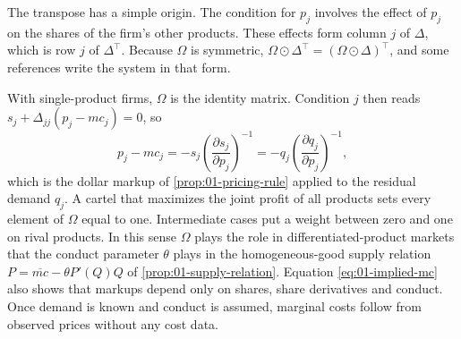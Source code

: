 The transpose has a simple origin. The condition for $p_j$ involves the effect of $p_j$ on the shares of the
firm's other products. These effects form column $j$ of $\Delta$, which is row $j$ of $\Delta^\top$.
Because $\Omega$ is symmetric, $\Omega \odot \Delta^\top = (\Omega \odot \Delta)^\top$, and some references
write the system in that form.

\begin{remark}\label{rem:01-foc-cases}
With single-product firms, $\Omega$ is the identity matrix. Condition $j$ then reads
$s_j + \Delta_{jj}(p_j - mc_j) = 0$, so
\[
  p_j - mc_j = -s_j\left(\frac{\partial s_j}{\partial p_j}\right)^{-1}
             = -q_j\left(\frac{\partial q_j}{\partial p_j}\right)^{-1},
\]
which is the dollar markup of \cref{prop:01-pricing-rule} applied to the residual demand $q_j$. A cartel that
maximizes the joint profit of all products sets every element of $\Omega$ equal to one. Intermediate cases
put a weight between zero and one on rival products. In this sense $\Omega$ plays the role in
differentiated-product markets that the conduct parameter $\theta$ plays in the homogeneous-good supply
relation $P = \overline{mc} - \theta P'(Q) Q$ of \cref{prop:01-supply-relation}. Equation
\eqref{eq:01-implied-mc} also shows that markups depend only on shares, share derivatives and conduct. Once
demand is known and conduct is assumed, marginal costs follow from observed prices without any cost data.
\end{remark}

